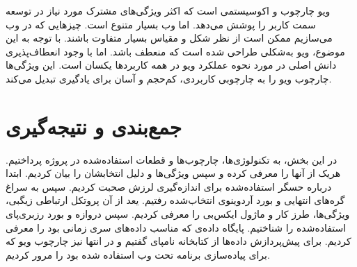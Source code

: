 ویو چارچوب و اکوسیستمی است که اکثر ویژگی‌های مشترک مورد نیاز در توسعه سمت کاربر را پوشش می‌دهد. اما وب بسیار متنوع است. چیزهایی که در وب می‌سازیم ممکن است از نظر شکل و مقیاس بسیار متفاوت باشند. با توجه به این موضوع، ویو به‌شکلی طراحی شده است که منعطف باشد. اما با وجود انعطاف‌پذیری دانش اصلی در مورد نحوه عملکرد ویو در همه کاربردها یکسان است\cite{vue}. این ویژگی‌ها چارچوب ویو را به چارچوبی کاربردی، کم‌حجم و آسان برای یادگیری تبدیل می‌کند.

\section{جمع‌بندی و نتیجه‌گیری}

در این بخش، به تکنولوژی‌ها، چارچوب‌ها و قطعات استفاده‌شده در پروژه پرداختیم. هریک از آنها را معرفی کرده و سپس ویژگی‌ها و دلیل انتخابشان را بیان کردیم. ابتدا درباره حسگر استفاده‌شده برای اندازه‌گیری لرزش صحبت کردیم. سپس به سراغ گره‌های انتهایی و بورد آردوینوی انتخاب‌شده رفتیم. یعد از آن پروتکل ارتباطی زیگبی، ویژگی‌ها، طرز کار و ماژول ایکس‌بی را معرفی کردیم. سپس دروازه و بورد رزبری‌پای استفاده‌شده را شناختیم. پایگاه داده‌ی  که مناسب داده‌های سری زمانی بود را معرفی کردیم. برای پیش‌پردازش داده‌ها از کتابخانه نامپای گفتیم و در انتها نیز چارچوب ویو که برای پیاده‌سازی برنامه تحت وب استفاده شده بود را مرور کردیم.